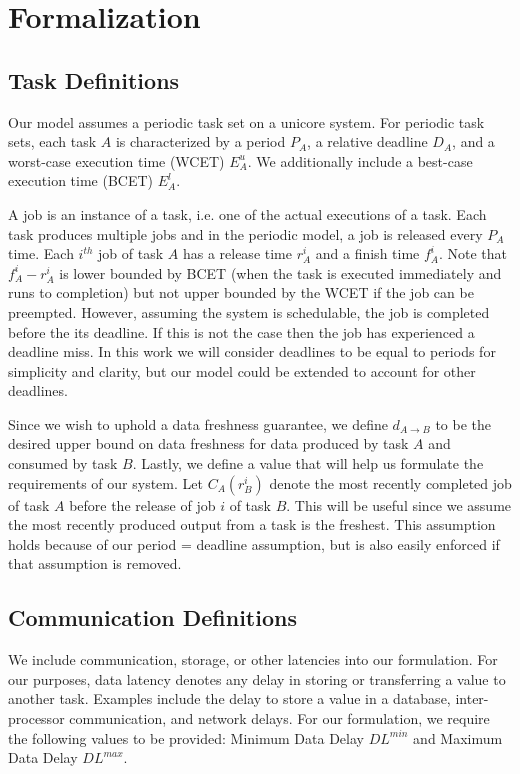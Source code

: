 \section{Formalization}

\subsection{Task Definitions}

Our model assumes a periodic task set on a unicore system. For periodic task sets, each task $A$ is characterized by a period $P_A$, a relative deadline $D_A$, and a worst-case execution time (WCET) $E^u_A$. We additionally include a best-case execution time (BCET) $E^l_A$.

A job is an instance of a task, i.e. one of the actual executions of a task. Each task produces multiple jobs and in the periodic model, a job is released every $P_A$ time. Each $i^{th}$ job of task $A$ has a release time $r^i_A$ and a finish time $f^i_A$. Note that $f^i_A - r^i_A$ is lower bounded by BCET (when the task is executed immediately and runs to completion) but not upper bounded by the WCET if the job can be preempted. However, assuming the system is schedulable, the job is completed before the its deadline. If this is not the case then the job has experienced a deadline miss. In this work we will consider deadlines to be equal to periods for simplicity and clarity, but our model could be extended to account for other deadlines.

Since we wish to uphold a data freshness guarantee, we define $d_{A \to B}$ to be the desired upper bound on data freshness for data produced by task $A$ and consumed by task $B$. Lastly, we define a value that will help us formulate the requirements of our system. Let $C_A(r^i_B)$ denote the most recently completed job of task $A$ before the release of job $i$ of task $B$. This will be useful since we assume the most recently produced output from a task is the freshest. This assumption holds because of our period = deadline assumption, but is also easily enforced if that assumption is removed.

\subsection{Communication Definitions}

We include communication, storage, or other latencies into our formulation. For our purposes, data latency denotes any delay in storing or transferring a value to another task. Examples include the delay to store a value in a database, inter-processor communication, and network delays. For our formulation, we require the following values to be provided: Minimum Data Delay $DL^{min}$ and Maximum Data Delay $DL^{max}$.

